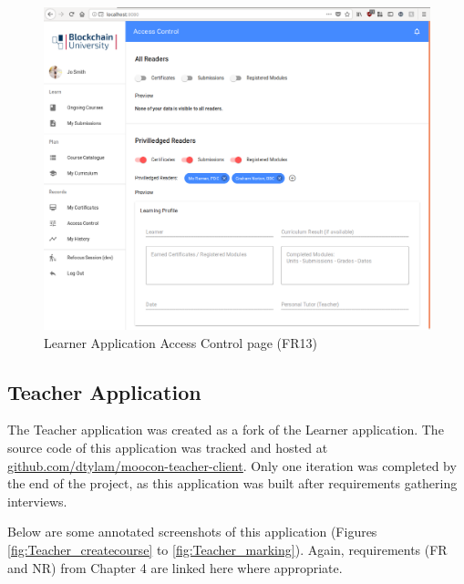 \begin{figure}[!ht]
	\centering
	\includegraphics[width=1.05\textwidth]{Learner_AC}
	\caption[Learner Application Access Control page]
	{Learner Application Access Control page (FR13)}
	\label{fig:Learner_AC}
\end{figure}

\clearpage
\subsection{Teacher Application}

The Teacher application was created as a fork of the Learner application. 
The source code of this application was tracked and hosted at 
\href{https://github.com/dtylam/moocon-teacher-client}{\underline{github.com/dtylam/moocon-teacher-client}}.
Only one iteration was completed by the end of the project, as this application was built after requirements gathering interviews.

Below are some annotated screenshots of this application (Figures \ref{fig:Teacher_createcourse} to 
\ref{fig:Teacher_marking}). Again, requirements (FR and NR) from Chapter 4 are linked here where appropriate.

